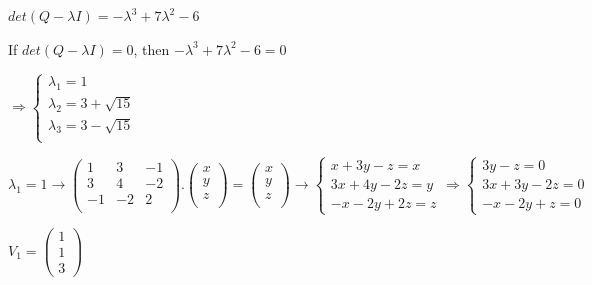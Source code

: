 \documentclass[fleqn]{article}
\begin{document}
\begin{enumerate}
      \textcolor{hwColor}{
        $det(Q-\lambda I)=-\lambda^3+7\lambda^2-6$
      }

      \textcolor{hwColor}{
        If $det(Q-\lambda I)=0$, then $-\lambda^3+7\lambda^2-6=0$
      }

      \textcolor{hwColor}{
        $
        \Longrightarrow 
        \begin{cases}
          \lambda_1=1 \\
          \lambda_2=3+\sqrt{15} \\
          \lambda_3=3-\sqrt{15} \\
        \end{cases}
        $
      }

      \textcolor{hwColor}{
        $
        \lambda_1=1 \rightarrow
        \begin{pmatrix}
          1 & 3 & -1 \\
          3 & 4 & -2 \\
          -1 & -2 & 2 \\
        \end{pmatrix}.\begin{pmatrix}
          x \\
          y \\
          z \\
        \end{pmatrix}=\begin{pmatrix}
          x \\
          y \\
          z \\
        \end{pmatrix}
        \rightarrow
        \begin{cases}
          x+3y-z=x \\
          3x+4y-2z=y \\
          -x-2y+2z=z
        \end{cases}
        \Longrightarrow
        \begin{cases}
         3y-z=0  \\
         3x+3y-2z=0  \\
         -x-2y+z=0 
        \end{cases}
        $
      }

      \textcolor{hwColor}{
        $
          V_1=\begin{pmatrix}
            1 \\
            1 \\
            3
          \end{pmatrix}
        $
      }


\end{enumerate}
\end{document}
